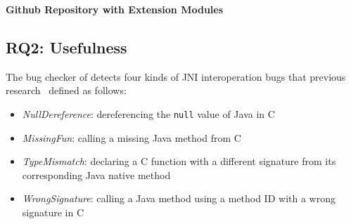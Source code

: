 \textbf{Github Repository with Extension Modules}


\subsection{RQ2: Usefulness}

The bug checker of \ours detects four kinds of JNI interoperation bugs
that previous research~\cite{ILEA, LeeASE20} defined as follows:

\begin{itemize}
  \item {\it NullDereference}: dereferencing the {\tt null} value of Java in C
  \item {\it MissingFun}: calling a missing Java method from C
  \item {\it TypeMismatch}: declaring a C function with a different signature
    from its corresponding Java native method
  \item {\it WrongSignature}: calling a Java method using a method ID with a
    wrong signature in C
\end{itemize}


